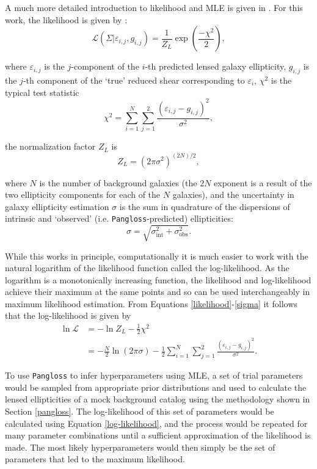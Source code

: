 \documentclass[%
 reprint,
 amsmath,amssymb,
 aps,nofootinbib
]{revtex4-1}
\begin{document}
A much more detailed introduction to likelihood and MLE is given in \cite{bayes_in_sky}. For this work, the likelihood is given by \cite{marshall_thesis}:
\begin{equation}\label{likelihood}
\mathcal{L}(\Sigma|\varepsilon_{i,j},g_{i,j})=\frac{1}{Z_L}\exp\left(\frac{-\chi^2}{2}\right),
\end{equation}

\noindent where $\varepsilon_{i,j}$ is the $j$-component of the $i$-th predicted lensed galaxy ellipticity, $g_{i,j}$ is the $j$-th component of the `true' reduced shear corresponding to $\varepsilon_i$, $\chi^2$ is the typical test statistic
\begin{equation}\label{chi2}
\chi^2=\sum_{i=1}^N\sum_{j=1}^2\frac{(\varepsilon_{i,j}-g_{i,j})^2}{\sigma^2},
\end{equation}

\noindent the normalization factor $Z_L$ is
\begin{equation}
Z_L=(2\pi\sigma^2)^{(2N)/2},
\end{equation}

\noindent where $N$ is the number of background galaxies (the $2N$ exponent is a result of the two ellipticity components for each of the $N$ galaxies), and the uncertainty in galaxy ellipticity estimation $\sigma$ is the sum in quadrature of the dispersions of intrinsic and `observed' (i.e. \texttt{Pangloss}-predicted) ellipticities:
\begin{equation}\label{sigma}
\sigma=\sqrt{\sigma_{\text{int}}^2+\sigma_{\text{obs}}^2}.
\end{equation}

While this works in principle, computationally it is much easier to work with the natural logarithm of the likelihood function called the log-likelihood. As the logarithm is a monotonically increasing function, the likelihood and log-likelihood achieve their maximum at the same points and so can be used interchangeably in maximum likelihood estimation. From Equations \eqref{likelihood}-\eqref{sigma} it follows that the log-likelihood is given by
\begin{align}\label{log-likelihood}
\ln\mathcal{L}&=-\ln Z_L-\frac{1}{2}\chi^2\nonumber \\
&=-\frac{N}{2}\ln(2\pi\sigma)-\frac{1}{2}\sum_{i=1}^N\sum_{j=1}^2\frac{(\varepsilon_{i,j}-g_{i,j})^2}{\sigma^2}.
\end{align}

To use \texttt{Pangloss} to infer hyperparameters using MLE, a set of trial parameters would be sampled from appropriate prior distributions and used to calculate the lensed ellipticities of a mock background catalog using the methodology shown in Section \ref{pangloss}. The log-likelihood of this set of parameters would be calculated using Equation \eqref{log-likelihood}, and the process would be repeated for many parameter combinations until a sufficient approximation of the likelihood is made. The most likely hyperparameters would then simply be the set of parameters that led to the maximum likelihood.
\end{document}
